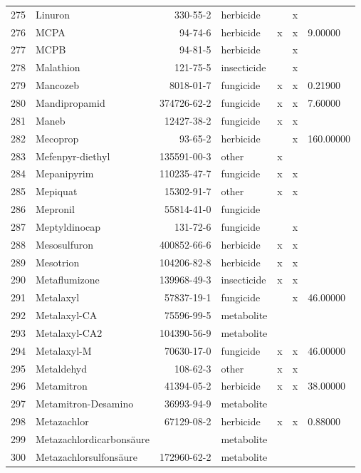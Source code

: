 \begin{longtable}{lp{3cm}rlp{1cm}p{1cm}p{1.5cm}}
  275 & Linuron & 330-55-2 & herbicide &  & x &  \\ 
  276 & MCPA & 94-74-6 & herbicide & x & x & 9.00000 \\ 
  277 & MCPB & 94-81-5 & herbicide &  & x &  \\ 
  278 & Malathion & 121-75-5 & insecticide &  & x &  \\ 
  279 & Mancozeb & 8018-01-7 & fungicide & x & x & 0.21900 \\ 
  280 & Mandipropamid & 374726-62-2 & fungicide & x & x & 7.60000 \\ 
  281 & Maneb & 12427-38-2 & fungicide & x & x &  \\ 
  282 & Mecoprop & 93-65-2 & herbicide &  & x & 160.00000 \\ 
  283 & Mefenpyr-diethyl & 135591-00-3 & other & x &  &  \\ 
  284 & Mepanipyrim & 110235-47-7 & fungicide & x & x &  \\ 
  285 & Mepiquat & 15302-91-7 & other & x & x &  \\ 
  286 & Mepronil & 55814-41-0 & fungicide &  &  &  \\ 
  287 & Meptyldinocap & 131-72-6 & fungicide &  & x &  \\ 
  288 & Mesosulfuron & 400852-66-6 & herbicide & x & x &  \\ 
  289 & Mesotrion & 104206-82-8 & herbicide & x & x &  \\ 
  290 & Metaflumizone & 139968-49-3 & insecticide & x & x &  \\ 
  291 & Metalaxyl & 57837-19-1 & fungicide &  & x & 46.00000 \\ 
  292 & Metalaxyl-CA & 75596-99-5 & metabolite &  &  &  \\ 
  293 & Metalaxyl-CA2 & 104390-56-9 & metabolite &  &  &  \\ 
  294 & Metalaxyl-M & 70630-17-0 & fungicide & x & x & 46.00000 \\ 
  295 & Metaldehyd & 108-62-3 & other & x & x &  \\ 
  296 & Metamitron & 41394-05-2 & herbicide & x & x & 38.00000 \\ 
  297 & Metamitron-Desamino & 36993-94-9 & metabolite &  &  &  \\ 
  298 & Metazachlor & 67129-08-2 & herbicide & x & x & 0.88000 \\ 
  299 & Metazachlor\-dicarbonsäure &  & metabolite &  &  &  \\ 
  300 & Metazachlor\-sulfonsäure & 172960-62-2 & metabolite &  &  &  \\ 

\end{longtable}
